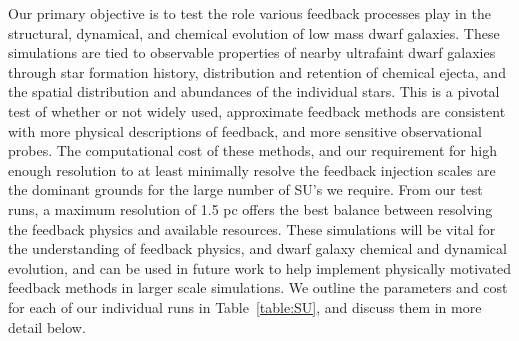 \documentclass[11pt]{article}
\begin{document}
Our primary objective is to test the role various feedback processes play in the structural, dynamical, and chemical evolution of low mass dwarf galaxies. These simulations are tied to observable properties of nearby ultrafaint dwarf galaxies through star formation history, distribution and retention of chemical ejecta, and the spatial distribution and abundances of the individual stars. This is a pivotal test of whether or not widely used, approximate feedback methods are consistent with more physical descriptions of feedback, and more sensitive observational probes. The computational cost of these methods, and our requirement for high enough resolution to at least minimally resolve the feedback injection scales are the dominant grounds for the large number of SU's we require. From our test runs, a maximum resolution of 1.5 pc offers the best balance between resolving the feedback physics and available resources. These simulations will be vital for the understanding of feedback physics, and dwarf galaxy chemical and dynamical evolution, and can be used in future work to help implement physically motivated feedback methods in larger scale simulations. We outline the parameters and cost for each of our individual runs in Table~\ref{table:SU}, and discuss them in more detail below.
\end{document}
